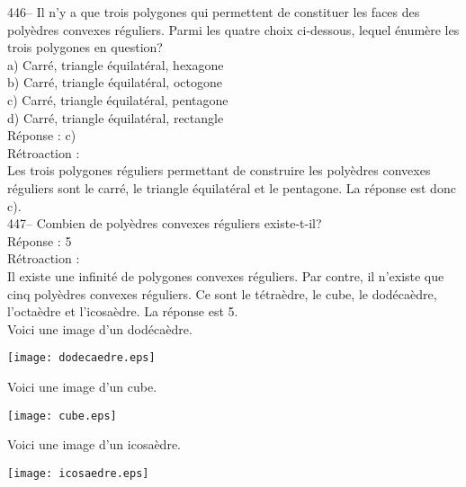 ﻿\documentclass[letterpaper, 12pt]{article}
\begin{document}
446-- Il n'y a que trois polygones qui permettent de constituer les faces
des poly\`edres convexes r\'eguliers.  Parmi les quatre choix ci-dessous,
lequel \'enum\`ere les trois polygones en question?\\
a) Carr\'e, triangle \'equilat\'eral, hexagone\\
b) Carr\'e, triangle \'equilat\'eral, octogone\\
c) Carr\'e, triangle \'equilat\'eral, pentagone\\
d) Carr\'e, triangle \'equilat\'eral, rectangle\\


R\'eponse : c)\\

R\'etroaction : \\
Les trois polygones r\'eguliers permettant de construire les poly\`edres
convexes r\'eguliers sont le carr\'e, le triangle \'equilat\'eral et le
pentagone.  La r\'eponse est donc c).\\

447-- Combien de poly\`edres convexes r\'eguliers existe-t-il?\\

R\'eponse : 5\\

R\'etroaction : \\
Il existe une infinit\'e de polygones convexes r\'eguliers.  Par contre, il
n'existe que cinq poly\`edres convexes r\'eguliers.  Ce sont le
t\'etra\`edre, le cube, le dod\'eca\`edre, l'octa\`edre et l'icosa\`edre.
La r\'eponse est 5.\\
Voici une image d'un dod\'eca\`edre.\\
    \begin{center}
    \texttt{[image: dodecaedre.eps]}
    \end{center}
Voici une image d'un cube.\\
    \begin{center}
    \texttt{[image: cube.eps]}
    \end{center}
Voici une image d'un icosa\`edre.\\
    \begin{center}
    \texttt{[image: icosaedre.eps]}
    \end{center}
\end{document}
